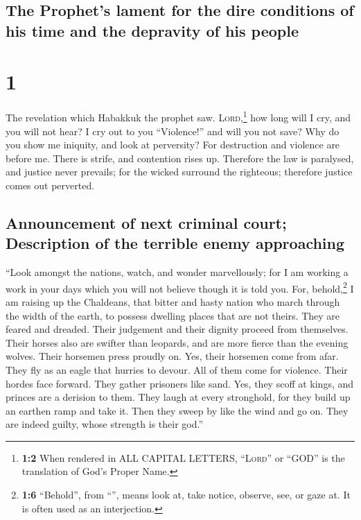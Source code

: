 \hypertarget{the-prophets-lament-for-the-dire-conditions-of-his-time-and-the-depravity-of-his-people}{%
\subsection{The Prophet's lament for the dire conditions of his time and
the depravity of his
people}\label{the-prophets-lament-for-the-dire-conditions-of-his-time-and-the-depravity-of-his-people}}

\hypertarget{section}{%
\section{1}\label{section}}

 The revelation which Habakkuk the prophet saw.
 \textsc{Lord},\footnote{\textbf{1:2} When rendered in ALL
  CAPITAL LETTERS, ``\textsc{Lord}'' or ``GOD'' is the translation of
  God's Proper Name.} how long will I cry, and you will not hear? I cry
out to you ``Violence!'' and will you not save?  Why do
you show me iniquity, and look at perversity? For destruction and
violence are before me. There is strife, and contention rises up.
 Therefore the law is paralysed, and justice never
prevails; for the wicked surround the righteous; therefore justice comes
out perverted.

\hypertarget{announcement-of-next-criminal-court-description-of-the-terrible-enemy-approaching}{%
\subsection{Announcement of next criminal court; Description of the
terrible enemy
approaching}\label{announcement-of-next-criminal-court-description-of-the-terrible-enemy-approaching}}

 ``Look amongst the nations, watch, and wonder
marvellously; for I am working a work in your days which you will not
believe though it is told you.  For, behold,\footnote{\textbf{1:6}
  ``Behold'', from ``'', means look at, take notice,
  observe, see, or gaze at. It is often used as an interjection.} I am
raising up the Chaldeans, that bitter and hasty nation who march through
the width of the earth, to possess dwelling places that are not theirs.
 They are feared and dreaded. Their judgement and their
dignity proceed from themselves.  Their horses also are
swifter than leopards, and are more fierce than the evening wolves.
Their horsemen press proudly on. Yes, their horsemen come from afar.
They fly as an eagle that hurries to devour.  All of them
come for violence. Their hordes face forward. They gather prisoners like
sand.  Yes, they scoff at kings, and princes are a
derision to them. They laugh at every stronghold, for they build up an
earthen ramp and take it.  Then they sweep by like the
wind and go on. They are indeed guilty, whose strength is their god.''

